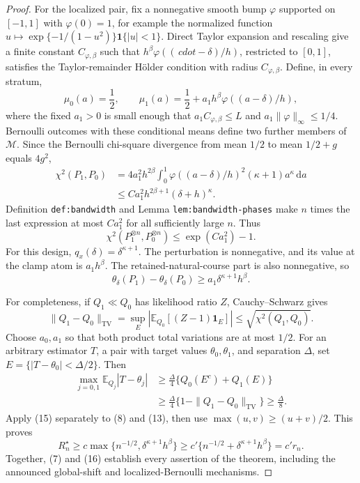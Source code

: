 \documentclass{article}
\begin{document}
\begin{proof}
For the localized pair, fix a nonnegative smooth bump \(\varphi\) supported on \([-1,1]\) with \(\varphi(0)=1\), for example the normalized function \(u\mapsto\exp\{-1/(1-u^2)\}\mathbf 1\{|u|<1\}\).  Direct Taylor expansion and rescaling give a finite constant \(C_{\varphi,\beta}\) such that \(h^\beta\varphi((\,cdot-\delta)/h)\), restricted to \([0,1]\), satisfies the Taylor-remainder Hölder condition with radius \(C_{\varphi,\beta}\).  Define, in every stratum,
\[
 \mu_0(a)=\frac12,
 \qquad
 \mu_1(a)=\frac12+a_1h^\beta\varphi((a-\delta)/h), \tag{10}
\]
where the fixed \(a_1>0\) is small enough that \(a_1C_{\varphi,\beta}\leq L\) and \(a_1\|\varphi\|_\infty\leq1/4\).  Bernoulli outcomes with these conditional means define two further members of \(\mathcal M\).  Since the Bernoulli chi-square divergence from mean \(1/2\) to mean \(1/2+g\) equals \(4g^2\),
\[
 \begin{aligned}
 \chi^2(P_1,P_0)
 &=4a_1^2h^{2\beta}\int_0^1
   \varphi((a-\delta)/h)^2(\kappa+1)a^\kappa\,\mathrm da\\
 &\leq Ca_1^2h^{2\beta+1}(\delta+h)^\kappa.
 \end{aligned} \tag{11}
\]
Definition \texttt{def:bandwidth} and Lemma \texttt{lem:bandwidth-phases} make \(n\) times the last expression at most \(Ca_1^2\) for all sufficiently large \(n\).  Thus
\[
 \chi^2(P_1^{\otimes n},P_0^{\otimes n})
 \leq\exp(Ca_1^2)-1. \tag{12}
\]
For this design, \(q_x(\delta)=\delta^{\kappa+1}\).  The perturbation is nonnegative, and its value at the clamp atom is \(a_1h^\beta\).  The retained-natural-course part is also nonnegative, so
\[
 \theta_\delta(P_1)-\theta_\delta(P_0)
 \geq a_1\delta^{\kappa+1}h^\beta. \tag{13}
\]

For completeness, if \(Q_1\ll Q_0\) has likelihood ratio \(Z\), Cauchy--Schwarz gives
\[
 \|Q_1-Q_0\|_{\mathrm{TV}}
 =\sup_E|\mathbb E_{Q_0}[(Z-1)\mathbf 1_E]|
 \leq\sqrt{\chi^2(Q_1,Q_0)}. \tag{14}
\]
Choose \(a_0,a_1\) so that both product total variations are at most \(1/2\).  For an arbitrary estimator \(T\), a pair with target values \(\theta_0,\theta_1\), and separation \(\Delta\), set \(E=\{|T-\theta_0|<\Delta/2\}\).  Then
\[
 \begin{aligned}
 \max_{j=0,1}\mathbb E_{Q_j}|T-\theta_j|
 &\geq\frac{\Delta}{4}\{Q_0(E^c)+Q_1(E)\}\\
 &\geq\frac{\Delta}{4}\{1-\|Q_1-Q_0\|_{\mathrm{TV}}\}
 \geq\frac{\Delta}{8}.
 \end{aligned} \tag{15}
\]
Apply (15) separately to (8) and (13), then use \(\max(u,v)\geq(u+v)/2\).  This proves
\[
 R_n^\star\geq c\max\{n^{-1/2},\delta^{\kappa+1}h^\beta\}
 \geq c'\{n^{-1/2}+\delta^{\kappa+1}h^\beta\}=c'r_n. \tag{16}
\]
Together, (7) and (16) establish every assertion of the theorem, including the announced global-shift and localized-Bernoulli mechanisms.
\end{proof}
\end{document}
